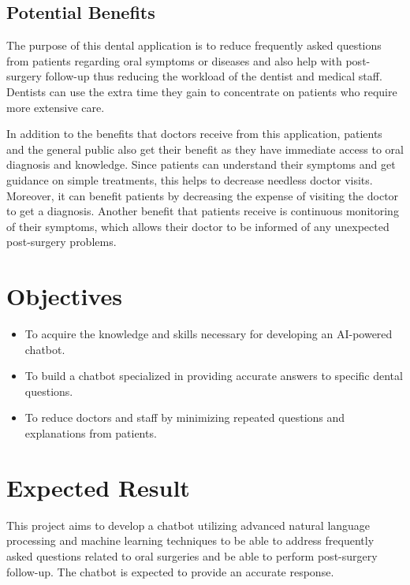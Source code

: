 \documentclass[12pt,oneside,openright,a4paper]{cpe-english-project}
\begin{document}
    \subsection{Potential Benefits}
      \qquad The purpose of this dental application is to reduce frequently asked questions from patients regarding oral symptoms or diseases and also help with post-surgery follow-up thus reducing the workload of the dentist and medical staff. Dentists can use the extra time they gain to concentrate on patients who require more extensive care.\par
      \qquad In addition to the benefits that doctors receive from this application, patients and the general public also get their benefit as they have immediate access to oral diagnosis and knowledge. Since patients can understand their symptoms and get guidance on simple treatments, this helps to decrease needless doctor visits. Moreover, it can benefit patients by decreasing the expense of visiting the doctor to get a diagnosis. Another benefit that patients receive is continuous monitoring of their symptoms, which allows their doctor to be informed of any unexpected post-surgery problems.\par

  \section{Objectives}
    \begin{itemize}
      \item To acquire the knowledge and skills necessary for developing an AI-powered chatbot. 
      \item To build a chatbot specialized in providing accurate answers to specific dental questions.
      \item To reduce doctors and staff by minimizing repeated questions and explanations from patients.
    \end{itemize}

  \section{Expected Result}
    \qquad This project aims to develop a chatbot utilizing advanced natural language processing and machine learning techniques to be able to address frequently asked questions related to oral surgeries and be able to perform post-surgery follow-up. The chatbot is expected to provide an accurate response. \par  
\end{document}
